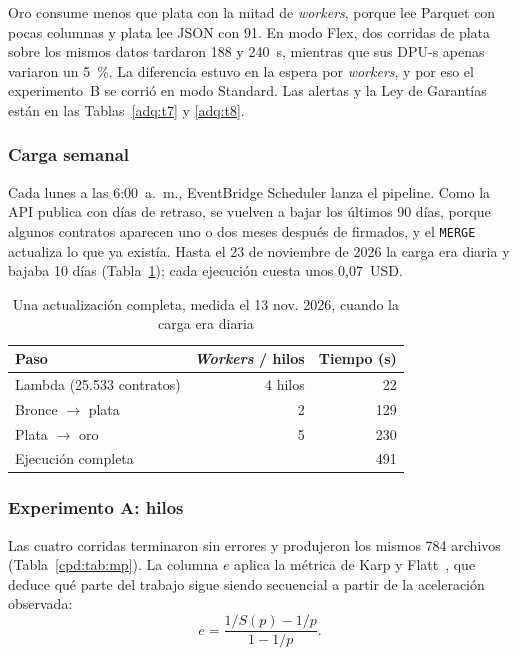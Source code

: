 Oro consume menos que plata con la mitad de \textit{workers}, porque lee Parquet con pocas columnas y plata lee JSON con 91. En modo Flex, dos corridas de plata sobre los mismos datos tardaron 188 y 240~s, mientras que sus DPU-s apenas variaron un 5~\%. La diferencia estuvo en la espera por \textit{workers}, y por eso el experimento~B se corrió en modo Standard. Las alertas y la Ley de Garantías están en las Tablas~\ref{adq:t7} y \ref{adq:t8}.

\subsubsection{Carga semanal}
Cada lunes a las 6:00~a.~m., EventBridge Scheduler lanza el pipeline. Como la API publica con días de retraso, se vuelven a bajar los últimos 90 días, porque algunos contratos aparecen uno o dos meses después de firmados, y el \texttt{MERGE} actualiza lo que ya existía. Hasta el 23 de noviembre de 2026 la carga era diaria y bajaba 10 días (Tabla~\ref{cpd:tab:diario}); cada ejecución cuesta unos 0,07~USD.

\begin{table}[!htbp]
\caption{Una actualización completa, medida el 13 nov. 2026, cuando la carga era diaria}
\label{cpd:tab:diario}
\centering
\begin{tabular}{@{}lrr@{}}
\toprule
Paso & \textit{Workers} / hilos & Tiempo (s) \\
\midrule
Lambda (25.533 contratos) & 4 hilos & 22 \\
Bronce $\rightarrow$ plata & 2 & 129 \\
Plata $\rightarrow$ oro & 5 & 230 \\
\midrule
Ejecución completa & & 491 \\
\bottomrule
\end{tabular}
\end{table}

\subsubsection{Experimento A: hilos}
Las cuatro corridas terminaron sin errores y produjeron los mismos 784 archivos (Tabla~\ref{cpd:tab:mp}). La columna $e$ aplica la métrica de Karp y Flatt~\cite{karp1990}, que deduce qué parte del trabajo sigue siendo secuencial a partir de la aceleración observada:
\begin{equation}
e = \frac{1/S(p) - 1/p}{1 - 1/p}.
\end{equation}


